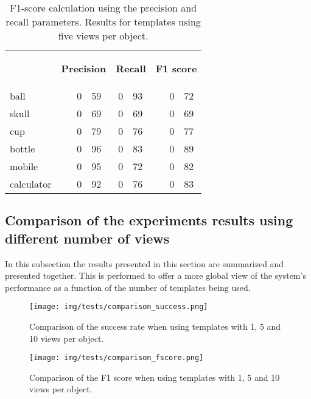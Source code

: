 \begin{table}[H]
\centering
\begin{tabular} {l l r@{.}l r@{.}l l r@{.}l }
\toprule
\addlinespace[3mm]
   \multicolumn{1}{c}{\begin{center}\textbf{Object}\end{center}} &
   \multicolumn{3}{c}{\begin{flushright}\textbf{Precision}\end{flushright}} &
   \multicolumn{2}{c}{\begin{flushright}\textbf{Recall}\end{flushright}} &
   \multicolumn{3}{c}{\begin{flushright}\hspace*{0.2cm}\textbf{F1 score}\end{flushright}} &\\
\addlinespace[-3mm]

\midrule
ball		&&	0&59 	&	0&93	&&	0&72	\\
skull		&&	0&69	&	0&69	&&	0&69	\\
cup			&&	0&79	&	0&76	&&	0&77	\\
bottle		&&	0&96	&	0&83	&&	0&89	\\
mobile		&&	0&95	&	0&72	&&	0&82	\\
calculator	&&	0&92	&	0&76	&&	0&83	\\

\bottomrule
\end{tabular}
\caption[F1-score - templates using 5 views]{F1-score calculation using the precision and recall parameters. Results for templates using five views per object. }
\label{10views_fscore}
\end{table}








	\subsection{Comparison of the experiments results using different number of views}
	In this subsection the results presented in this section are summarized and presented together. 
	This is performed to offer a more global view of the system's performance as a function of the number of templates being used. 

	\begin{figure}[H]
		\begin{center}
	    \texttt{[image: img/tests/comparison\_success.png]}
		\caption[Comparison of the success rate]{Comparison of the success rate when using templates with 1, 5 and 10 views per object.}
		\label{comparison_success}
		\end{center}
	\end{figure}

	\begin{figure}[H]
		\begin{center}
	    \texttt{[image: img/tests/comparison\_fscore.png]}
		\caption[Comparison of the F1 score]{Comparison of the F1 score when using templates with 1, 5 and 10 views per object.}
		\label{comparison_fscore}
		\end{center}
	\end{figure}